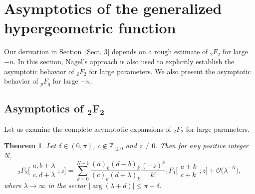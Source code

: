 \documentclass[11pt]{article}
\numberwithin{equation}{section}
\numberwithin{equation}{section}
\newtheorem{Theorem}{Theorem}[section]
\newcommand{\ZZ}{\ensuremath{\mathbb{Z}}}
\newcommand{\mo}{\mathcal{O}}
\begin{document}
\setcounter{section}{3}
\section{Asymptotics of the generalized hypergeometric function}\label{Sect. 4}
Our derivation in Section~\ref{Sect. 3} depends on a rough estimate of $_2F_2$ for large $-n$. In this section, Nagel's approach is also used to explicitly establish the asymptotic behavior of $_2F_2$ for large parameters. We also present the asymptotic behavior of $_pF_q$ for large $-n$.

\subsection[Asymptotics of \_2F\_2]{Asymptotics of $\boldsymbol{_2F_2}$}
Let us examine the complete asymptotic expansions of $_2F_2$ for large parameters.

\begin{Theorem}\label{Thm: 2F2 large parameter--lambda}
	Let $\delta\in (0,\pi)$, $c\notin\ZZ_{\leqslant 0}$ and $z\ne 0$. Then for any positive integer $N$,
	\begin{equation}\label{2F2 large parameter--lambda}
		{}_2F_2\biggl[\begin{matrix}
			a,b+\lambda\\
			c,d+\lambda
		\end{matrix};z\biggr]=\sum_{k=0}^{N-1}\frac{(a)_k (d-b )_k}{(c)_k (d+\lambda )_k}\frac{ (-z )^k}{k!}{}_1F_1\biggl[\begin{matrix}
			a+k\\
			c+k
		\end{matrix};z\biggr]+\mo \bigl(\lambda^{-N} \bigr),
	\end{equation}
	where $\lambda\to\infty$ in the sector $|{\arg}(\lambda+d)|\leqslant \pi-\delta$.
\end{Theorem}
\end{document}
